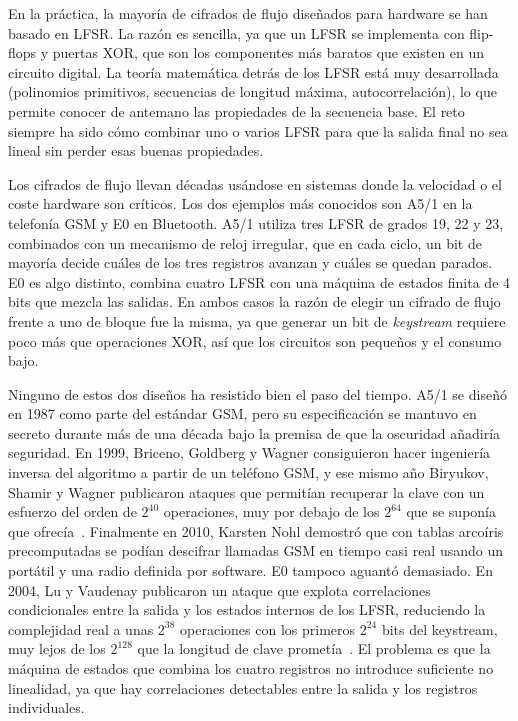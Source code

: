 En la práctica, la mayoría de cifrados de flujo diseñados para hardware se han basado en LFSR.
La razón es sencilla, ya que un LFSR se implementa con flip-flops y puertas XOR, que son los componentes más baratos que existen en un circuito digital.
La teoría matemática detrás de los LFSR está muy desarrollada (polinomios primitivos, secuencias de longitud máxima, autocorrelación),
lo que permite conocer de antemano las propiedades de la secuencia base. El reto siempre ha sido cómo combinar uno o varios
LFSR para que la salida final no sea lineal sin perder esas buenas propiedades.

Los cifrados de flujo llevan décadas usándose en sistemas donde la velocidad o el coste hardware son críticos.
Los dos ejemplos más conocidos son A5/1 en la telefonía GSM y E0 en Bluetooth.
A5/1 utiliza tres LFSR de grados 19, 22 y 23, combinados con un mecanismo de reloj irregular,
que en cada ciclo, un bit de mayoría decide cuáles de los tres registros avanzan y cuáles se quedan parados.
E0 es algo distinto, combina cuatro LFSR con una máquina de estados finita de 4 bits que mezcla las salidas.
En ambos casos la razón de elegir un cifrado de flujo frente a uno de bloque fue la misma,
ya que generar un bit de \textit{keystream} requiere poco más que operaciones XOR, así que los circuitos son pequeños y el consumo bajo.

Ninguno de estos dos diseños ha resistido bien el paso del tiempo. A5/1 se diseñó en 1987 como parte del estándar GSM,
pero su especificación se mantuvo en secreto durante más de una década bajo la premisa de que la oscuridad añadiría seguridad.
En 1999, Briceno, Goldberg y Wagner consiguieron hacer ingeniería inversa del algoritmo a partir de un teléfono GSM,
y ese mismo año Biryukov, Shamir y Wagner publicaron ataques que permitían recuperar
la clave con un esfuerzo del orden de $2^{40}$ operaciones, muy por debajo de los $2^{64}$ que se suponía que ofrecía~\cite{biryukov2000}.
Finalmente en 2010, Karsten Nohl demostró que con tablas arcoíris precomputadas se podían descifrar llamadas GSM
en tiempo casi real usando un portátil y una radio definida por software. E0 tampoco aguantó demasiado.
En 2004, Lu y Vaudenay publicaron un ataque que explota correlaciones condicionales
entre la salida y los estados internos de los LFSR, reduciendo la complejidad real a unas $2^{38}$ operaciones
con los primeros $2^{24}$ bits del keystream, muy lejos de los $2^{128}$ que la longitud de clave prometía~\cite{lu2004}.
El problema es que la máquina de estados que combina los cuatro registros no introduce suficiente no linealidad,
ya que hay correlaciones detectables entre la salida y los registros individuales.

